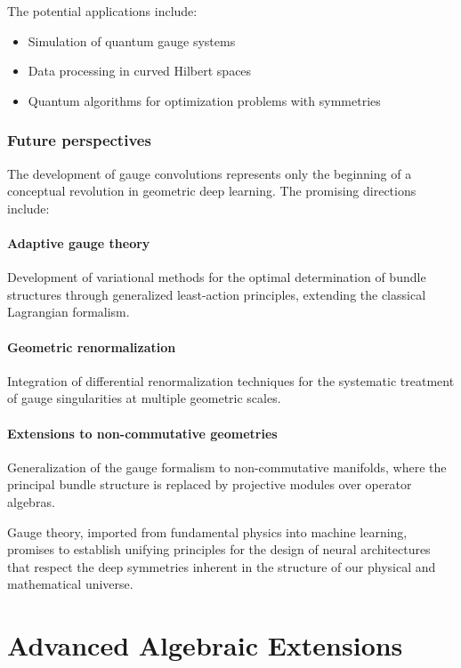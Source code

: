 The potential applications include:
\begin{itemize}
\item Simulation of quantum gauge systems
\item Data processing in curved Hilbert spaces
\item Quantum algorithms for optimization problems with symmetries
\end{itemize}

\subsubsection{Future perspectives}

The development of gauge convolutions represents only the beginning of a conceptual revolution in geometric deep learning. The promising directions include:

\paragraph{Adaptive gauge theory}
Development of variational methods for the optimal determination of bundle structures through generalized least-action principles, extending the classical Lagrangian formalism.

\paragraph{Geometric renormalization}
Integration of differential renormalization techniques for the systematic treatment of gauge singularities at multiple geometric scales.

\paragraph{Extensions to non-commutative geometries}
Generalization of the gauge formalism to non-commutative manifolds, where the principal bundle structure is replaced by projective modules over operator algebras.

Gauge theory, imported from fundamental physics into machine learning, promises to establish unifying principles for the design of neural architectures that respect the deep symmetries inherent in the structure of our physical and mathematical universe.

\section{Advanced Algebraic Extensions}\label{sec:algebraic_extensions}

